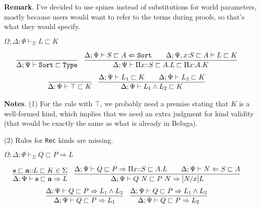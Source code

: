 \documentclass[letterpaper, 11pt]{article}
\newcommand{\Rar}{\Rightarrow}
\newcommand{\Lar}{\Leftarrow}
\newcommand{\Type}{\texttt{Type}}
\newcommand{\Sort}{\texttt{Sort}}
\begin{document}
    \textbf{Remark}.  I've decided to use spines instead of substitutions for world parameters, mostly because users would want to refer to
    the terms during proofs, so that's what they would specify.

    $\boxed{\Omega; \Delta; \Psi \vdash_\Sigma L \sqsubset K}$
    
    \begin{align*}
      & \infer{\Delta ; \Psi \vdash \Sort \sqsubset \Type}{} &
      & \infer{\Delta ; \Psi \vdash \Pi x{::}S \sqsubset A.L \sqsubset \Pi x{:}A.K}
        {
          \Delta ; \Psi \vdash S \sqsubset A \Lar \Sort
          &&
          \Delta ; \Psi, x {:} S \sqsubset A \vdash L \sqsubset K
        }
    \end{align*}
    \begin{align*}
      & \infer{\Delta ; \Psi \vdash \top \sqsubset K}{} &
      & \infer{\Delta ; \Psi \vdash L_1 \land L_2 \sqsubset K}
        {
          \Delta ; \Psi  \vdash L_1 \sqsubset K
          &&
          \Delta ; \Psi  \vdash L_2 \sqsubset K
        }
    \end{align*}

    \textbf{Notes}. (1) For the rule with $\top$, we probably need a premise stating that $K$ is a well-formed kind, which implies that we need an extra
    judgment for kind validity (that would be exactly the same as what is already in Beluga).

    (2) Rules for \texttt{Rec} kinds are missing.

    $\boxed{\Omega; \Delta; \Psi \vdash_\Sigma Q \sqsubset P \Rar L}$

    \begin{align*}
      & \infer{\Delta ; \Psi \vdash \textbf{s} \sqsubset \textbf{a} \Rar L}
        {
          \textbf{s} \sqsubset \textbf{a} {::} L \sqsubset K \in \Sigma
        } &
      & \infer{\Delta; \Psi \vdash Q \ N \sqsubset P \ N \Rar [N/x]L}
        {
          \Delta ; \Psi \vdash Q \sqsubset P \Rar \Pi x{::}S \sqsubset A. L
          &&
          \Delta ; \Psi \vdash N \Lar S \sqsubset A
        }
    \end{align*}
    \begin{align*}
      & \infer{\Delta ; \Psi \vdash Q \sqsubset P \Rar L_1}
        {
          \Delta ; \Psi \vdash Q \sqsubset P \Rar L_1 \land L_2
        } &
      & \infer{\Delta ; \Psi \vdash Q \sqsubset P \Rar L_2}
        {
          \Delta ; \Psi \vdash Q \sqsubset P \Rar L_1 \land L_2
        }
    \end{align*}
\end{document}
